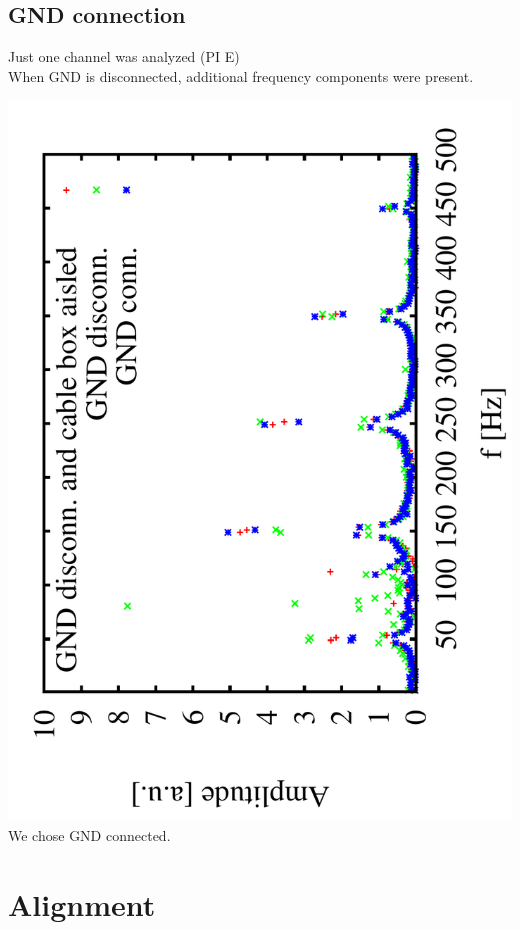 \documentclass[a4paper,11pt]{book}
\begin{document}
\subsection{GND connection}
 Just one channel was analyzed (PI E)\\
 When GND is {\color{green}disconnected}, additional frequency components were present.\par
\includegraphics[angle=-90,scale=0.30]{image_ai_41.pdf}\\
We chose {\color{blue}GND connected}.\par

\section{Alignment}
\end{document}
